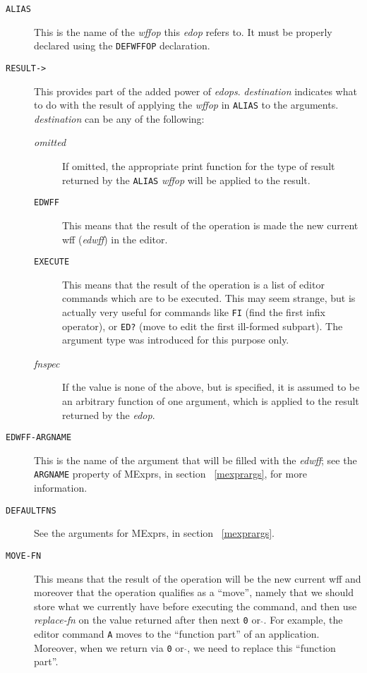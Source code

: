 \begin{description}
\item [{\tt ALIAS}] This is the name of the {\it wffop} this {\it edop} refers to.  It must
be properly declared using the {\tt DEFWFFOP} declaration.

\item [{\tt RESULT->}] This provides part of the added power of {\it edops}.  {\it destination}
indicates what to do with the result of applying the {\it wffop} in {\tt ALIAS}
to the arguments.  {\it destination} can be any of the following:
\begin{description}
\item [{\it omitted}] If omitted, the appropriate print function for the type of
result returned by the {\tt ALIAS} {\it wffop} will be applied to the result.

\item [{\tt EDWFF}] This means that the result of the operation is made the new
current wff ({\it edwff}) in the editor.

\item [{\tt EXECUTE}] This means that the result of the operation is a list of
editor commands which are to be executed.  This may seem strange, but
is actually very useful for commands like {\tt FI} (find the first infix operator),
or {\tt ED?} (move to edit the first ill-formed subpart).  The argument
type  was introduced for this purpose only.

\item [{\it fnspec}] If the value is none of the above, but is specified, it is
assumed to be an arbitrary function of one argument, which is applied
to the result returned by the {\it edop}.
\end{description}

\item [{\tt EDWFF-ARGNAME}] This is the name of the argument that will be filled with the
{\it edwff}; see the {\tt ARGNAME} property of MExprs, in section ~\ref{mexprargs}, 
for more information.

\item [{\tt DEFAULTFNS}] See the arguments for MExprs, in section ~\ref{mexprargs}.

\item [{\tt MOVE-FN}] This means that the result of the operation will be the new current
wff and moreover that the operation qualifies as a ``move'', namely
that we should store what we currently have before executing the command,
and then use {\it replace-fn} on the value returned after then next {\tt 0} or {\tt $\hat{}$}. 
For example, the editor command {\tt A} moves to the ``function part'' of an 
application.  Moreover, when we return via {\tt 0} or {\tt $\hat{}$}, we need to replace 
this ``function part''.

\end{description}

